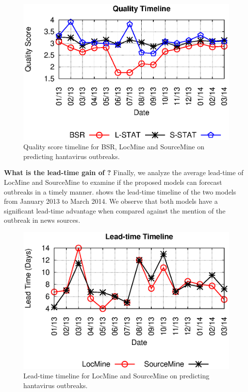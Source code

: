 \documentclass[conference]{IEEEtran}
\newcommand{\fullmodel}{{{\sf SourceMine}}\xspace}
\newcommand{\locationmodel}{{\sf LocMine}\xspace}
\begin{document}
\begin{figure}[h]
\vspace{-10pt}
\begin{center}
	\includegraphics[trim=0 0 0 0, clip,scale=0.5]{fig/quality_timeline.eps}
\end{center}
\caption{Quality score timeline for BSR, \locationmodel and \fullmodel on predicting hantavirus outbreaks.}
 \label{fig:quality_timeline}
\end{figure}

\noindent\textbf{What is the lead-time gain of {}?} Finally, we analyze the average lead-time of \locationmodel and \fullmodel to examine if the proposed models can forecast outbreaks in a timely manner.  shows the lead-time timeline of the two models from January 2013 to March 2014. We observe that both models have a significant lead-time advantage when compared against  the mention of the outbreak in news sources.

\begin{figure}[h]
\vspace{-10pt}
\begin{center}
	\includegraphics[trim=0 0 0 0, clip,scale=0.5]{fig/lead_timeline.eps}
\end{center}
\caption{Lead-time timeline for \locationmodel and \fullmodel on predicting hantavirus outbreaks.}
 \label{fig:lead_timeline}
 \vspace{-10pt}
\end{figure}
\end{document}
